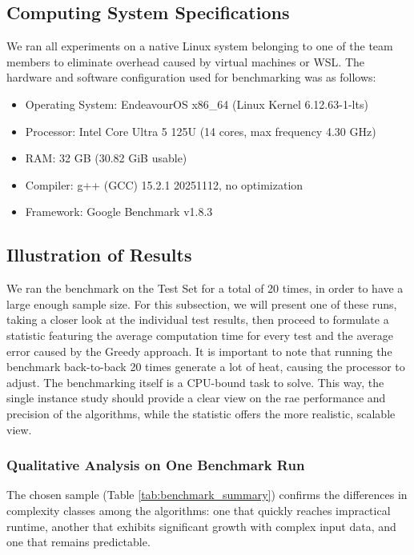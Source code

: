 \subsection{Computing System Specifications}
\label{subsec:specs}

We ran all experiments on a native Linux system belonging to one of the team members to eliminate overhead caused by virtual machines or WSL. 
The hardware and software configuration used for benchmarking was as follows:

\begin{itemize}
    \item Operating System: EndeavourOS x86\_64 (Linux Kernel 6.12.63-1-lts)
    \item Processor: Intel Core Ultra 5 125U (14 cores, max frequency 4.30 GHz)
    \item RAM: 32 GB (30.82 GiB usable)
    \item Compiler: g++ (GCC) 15.2.1 20251112, no optimization
    \item Framework: Google Benchmark \cite{googlebenchmark} v1.8.3
\end{itemize}

\subsection{Illustration of Results}
\label{subsec:illustration}

We ran the benchmark on the Test Set for a total of 20 times, in order to have a large enough sample size. For this subsection, we will present one of these 
runs, taking a closer look at the individual test results, then proceed to formulate a statistic featuring the average computation time for every test 
and the average error caused by the Greedy approach. It is important to note that running the benchmark back-to-back 20 times generate a lot of heat, 
causing the processor to adjust. The benchmarking itself is a CPU-bound task to solve. This way, the single instance study should provide a clear view 
on the rae performance and precision of the algorithms, while the statistic offers the more realistic, scalable view.

\subsubsection{Qualitative Analysis on One Benchmark Run}

The chosen sample (Table \ref{tab:benchmark_summary}) confirms the differences in complexity classes among the algorithms: one that quickly reaches 
impractical runtime, another that exhibits significant growth with complex input data, and one that remains predictable.

